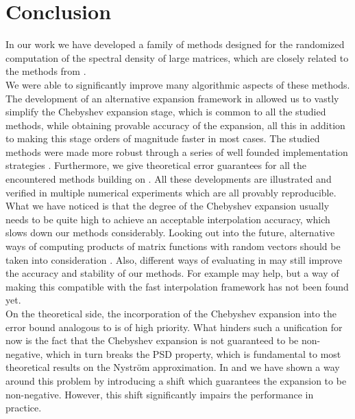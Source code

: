 \chapter{Conclusion}
\label{chp:6-conclusion}

In our work we have developed a family of methods
designed for the randomized computation of the spectral density of large matrices,
which are closely related to the methods from \cite{lin2017randomized}.\\

We were able to
significantly improve many algorithmic aspects of these methods. The development
of an alternative expansion framework in 
allowed us to vastly simplify the Chebyshev expansion stage, which is common to all the
studied methods, while obtaining provable accuracy of the expansion, all this in
addition to making this stage orders of magnitude faster in most cases. 
The studied methods were made more robust through a series of well founded
implementation strategies .
Furthermore, we give theoretical error guarantees for all the encountered
methods building on \cite{he2023parameter}.
All these developments are illustrated and verified in multiple numerical experiments
which are all provably reproducible.\\

What we have noticed is that the degree of the Chebyshev expansion usually needs
to be quite high to achieve an acceptable interpolation accuracy, which slows down
our methods considerably. Looking out into the future, alternative ways of
computing products of matrix functions with random vectors should be taken into
consideration \cite{cortinovis2023speeding,ubaru2017lanczos}. Also, different ways
of evaluating  in 
may still improve the accuracy and stability of our methods. For example
\cite[algorithm~5.6]{tropp2023randomized} may help, but a way of making this
compatible with the fast interpolation framework has not been found yet.\\

On the theoretical side, the incorporation of the Chebyshev expansion into the
error bound analogous to  is of high priority.
What hinders such a unification for now is the fact that the Chebyshev expansion
is not guaranteed to be non-negative, which in turn breaks the \gls{PSD} property,
which is fundamental to most theoretical results on the Nystr\"om approximation.
In  and 
we have shown a way around this problem by introducing a shift which guarantees
the expansion to be non-negative. However, this shift significantly impairs the
performance in practice.
